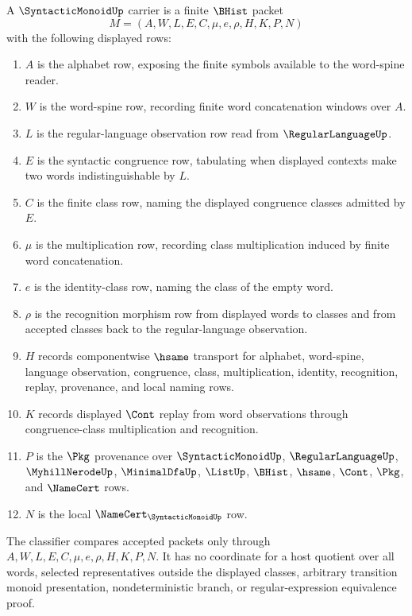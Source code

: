 \begin{definition}
\label{def:syntactic-monoid-carrier}
A $\SyntacticMonoidUp$ carrier is a finite $\BHist$ packet
$$
M=(A,W,L,E,C,\mu,e,\rho,H,K,P,N)
$$
with the following displayed rows:
\begin{enumerate}
\item $A$ is the alphabet row, exposing the finite symbols available to the word-spine reader.
\item $W$ is the word-spine row, recording finite word concatenation windows over $A$.
\item $L$ is the regular-language observation row read from $\RegularLanguageUp$.
\item $E$ is the syntactic congruence row, tabulating when displayed contexts make two words indistinguishable by $L$.
\item $C$ is the finite class row, naming the displayed congruence classes admitted by $E$.
\item $\mu$ is the multiplication row, recording class multiplication induced by finite word concatenation.
\item $e$ is the identity-class row, naming the class of the empty word.
\item $\rho$ is the recognition morphism row from displayed words to classes and from accepted classes back to the regular-language observation.
\item $H$ records componentwise $\hsame$ transport for alphabet, word-spine, language observation, congruence, class, multiplication, identity, recognition, replay, provenance, and local naming rows.
\item $K$ records displayed $\Cont$ replay from word observations through congruence-class multiplication and recognition.
\item $P$ is the $\Pkg$ provenance over $\SyntacticMonoidUp$, $\RegularLanguageUp$, $\MyhillNerodeUp$, $\MinimalDfaUp$, $\ListUp$, $\BHist$, $\hsame$, $\Cont$, $\Pkg$, and $\NameCert$ rows.
\item $N$ is the local $\NameCert_{\SyntacticMonoidUp}$ row.
\end{enumerate}
The classifier compares accepted packets only through $A,W,L,E,C,\mu,e,\rho,H,K,P,N$. It has no coordinate for a host quotient over all words, selected representatives outside the displayed classes, arbitrary transition monoid presentation, nondeterministic branch, or regular-expression equivalence proof.
\end{definition}


